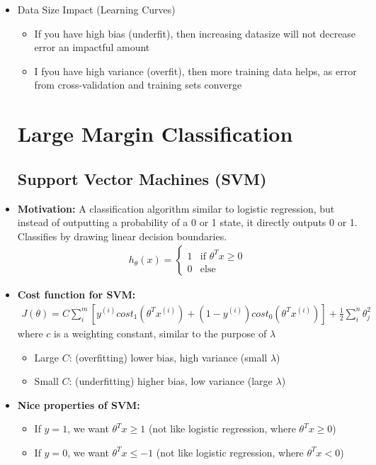 \documentclass[titlepage]{article}
\begin{document}
\begin{itemize}
\item Data Size Impact (Learning Curves)
\begin{itemize} [label= $\bullet$]
	\item If you have high bias (underfit), then increasing datasize will not decrease error an impactful amount
	\item I fyou have high variance (overfit), then more training data helps, as error from cross-validation and training sets converge
\end{itemize}

\section{Large Margin Classification}
\subsection{Support Vector Machines (SVM)}

\item \textbf{Motivation:} A classification algorithm similar to logistic regression, but instead of outputting a probability of a 0 or 1 state, it directly outputs 0 or 1. Classifies by drawing linear decision boundaries.
\begin{align*}
	h_\theta(x) = \begin{cases} 1 &\mbox{if } \theta^Tx \geq 0 \\
		0 &\mbox{else } \end{cases}
\end{align*}


\item \textbf{Cost function for SVM:}
\begin{align*}
	J(\theta) = C \sum_{i}^{m} \left[y^{(i)}cost_1(\theta^Tx^{(i)}) + (1-y^{(i)})cost_0(\theta^Tx^{(i)})\right] + \frac{1}{2} \sum_i^n \theta_j^2
\end{align*}
where $c$ is a weighting constant, similar to the purpose of $\lambda$
\begin{itemize} [label = $\bullet$]
	\item Large $C$: (overfitting) lower bias, high variance (small $\lambda$)
	\item Small $C$: (underfitting) higher bias, low variance (large $\lambda$)
\end{itemize}
\item \textbf{Nice properties of SVM:}
\begin{itemize} [label = $\bullet$]
	\item If $y =1$, we want $\theta^Tx \geq 1$ (not like logistic regression, where $\theta^Tx \geq 0$)
	\item If $y=0$, we want $\theta^Tx \leq -1$ (not like logistic regression, where $\theta^Tx <0$)
\end{itemize}


\end{itemize}
\end{document}
